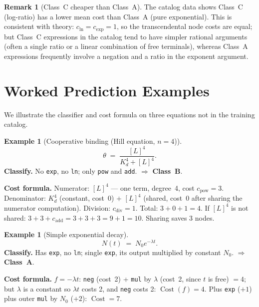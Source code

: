 \documentclass[12pt,a4paper]{article}
\theoremstyle{definition}
\newtheorem{remark}[theorem]{Remark}
\newtheorem{example}[theorem]{Example}
\newcommand{\Cost}{\operatorname{Cost}}
\newcommand{\cexp}{c_{\mathrm{exp}}}
\newcommand{\cln}{c_{\mathrm{ln}}}
\newcommand{\cdiv}{c_{\mathrm{div}}}
\newcommand{\cadd}{c_{\mathrm{add}}}
\newcommand{\cpow}{c_{\mathrm{pow}}}
\begin{document}
\begin{remark}[Class~C cheaper than Class~A]
The catalog data shows Class~C (log-ratio) has a lower mean cost than
Class~A (pure exponential).
This is consistent with theory: $\cln = \cexp = 1$, so the transcendental
node costs are equal; but Class~C expressions in the catalog tend to have
simpler rational arguments (often a single ratio or a linear combination of
free terminals), whereas Class~A expressions frequently involve a negation
and a ratio in the exponent argument.
\end{remark}

\section{Worked Prediction Examples}
\label{sec:predictions}

We illustrate the classifier and cost formula on three equations not in
the training catalog.

\begin{example}[Cooperative binding (Hill equation, $n=4$)]
\[
  \theta \;=\; \frac{[L]^4}{K_d^4 + [L]^4}.
\]
\textbf{Classify.} No \texttt{exp}, no \texttt{ln}; only \texttt{pow} and
\texttt{add}.
$\Rightarrow$ \textbf{Class~B}.

\textbf{Cost formula.}
Numerator: $[L]^4$ --- one term, degree~4, cost $\cpow = 3$.
Denominator: $K_d^4$ (constant, cost~0) $+$ $[L]^4$ (shared, cost~0 after
sharing the numerator computation).
Division: $\cdiv = 1$.
Total: $3 + 0 + 1 = 4$.
If $[L]^4$ is not shared: $3 + 3 + \cadd = 3 + 3 + 3 = 9 + 1 = 10$.
Sharing saves 3 nodes.
\end{example}

\begin{example}[Simple exponential decay]
\[
  N(t) \;=\; N_0 e^{-\lambda t}.
\]
\textbf{Classify.} Has \texttt{exp}, no \texttt{ln}; single \texttt{exp},
its output multiplied by constant $N_0$.
$\Rightarrow$ \textbf{Class~A}.

\textbf{Cost formula.}
$f = -\lambda t$: \texttt{neg} (cost~2) + \texttt{mul} by $\lambda$
(cost~2, since $t$ is free) $= 4$; but $\lambda$ is a constant so $\lambda t$
costs 2, and \texttt{neg} costs 2: $\Cost(f) = 4$.
Plus \texttt{exp} ($+1$) plus outer \texttt{mul} by $N_0$ ($+2$): $\Cost = 7$.
\end{example}
\end{document}
